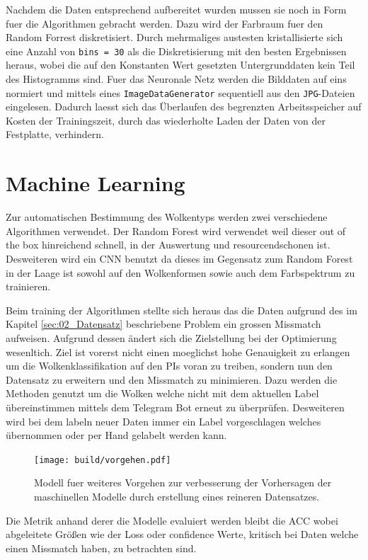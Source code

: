 Nachdem die Daten entsprechend aufbereitet wurden mussen sie noch in Form fuer
die Algorithmen gebracht werden. 
Dazu wird der Farbraum fuer den Random Forrest diskretisiert.
Durch mehrmaliges austesten kristallisierte sich eine Anzahl von 
\texttt{bins = 30} als die Diskretisierung mit den besten Ergebnissen heraus,
wobei die auf den Konstanten Wert gesetzten Untergrunddaten kein Teil des
Histogramms sind.
Fuer das Neuronale Netz werden die Bilddaten auf eins normiert und mittels 
eines \texttt{ImageDataGenerator} sequentiell aus den \texttt{JPG}-Dateien 
eingelesen. 
Dadurch laesst sich das Überlaufen des begrenzten Arbeitsspeicher auf Kosten 
der Trainingszeit, durch das wiederholte Laden der Daten von der Festplatte,
verhindern.


\section{Machine Learning}

Zur automatischen Bestimmung des Wolkentyps werden zwei verschiedene 
Algorithmen verwendet. 
Der Random Forest wird verwendet weil dieser out of the box hinreichend 
schnell, in der Auswertung und resourcendschonen ist.
Desweiteren wird ein CNN benutzt da dieses im Gegensatz zum Random Forest in 
der Laage ist sowohl auf den Wolkenformen sowie auch dem Farbspektrum zu
trainieren. 

Beim training der Algorithmen stellte sich heraus das die Daten aufgrund des im
Kapitel \ref{sec:02_Datensatz} beschriebene Problem ein grossen Missmatch 
aufweisen. 
Aufgrund dessen ändert sich die Zielstellung bei der Optimierung wesenltich.
Ziel ist vorerst nicht einen moeglichst hohe Genauigkeit zu erlangen um die
Wolkenklassifikation auf den PIs voran zu treiben, sondern nun den Datensatz zu
erweitern und den Missmatch zu minimieren.
Dazu werden die Methoden genutzt um die Wolken welche nicht mit dem aktuellen
Label übereinstimmen mittels dem Telegram Bot erneut zu überprüfen.
Desweiteren wird bei dem labeln neuer Daten immer ein Label vorgeschlagen
welches übernommen oder per Hand gelabelt werden kann.
\begin{figure}
		\centering
		\texttt{[image: build/vorgehen.pdf]}
		\caption{Modell fuer weiteres Vorgehen zur verbesserung der Vorhersagen
		der maschinellen Modelle durch erstellung eines reineren Datensatzes.}
		\label{fig:}
\end{figure}

Die Metrik anhand derer die Modelle evaluiert werden bleibt die ACC wobei 
abgeleitete Größen wie der Loss oder confidence Werte, kritisch bei Daten 
welche einen Missmatch haben, zu betrachten sind.

